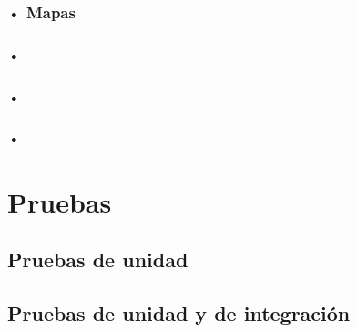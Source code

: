 \subsubsection{• Mapas}
\subsubsection{•}
\subsubsection{•}
\subsubsection{•}
\section{Pruebas}
\subsection{Pruebas de unidad}
\subsection{Pruebas de unidad y de integración}


